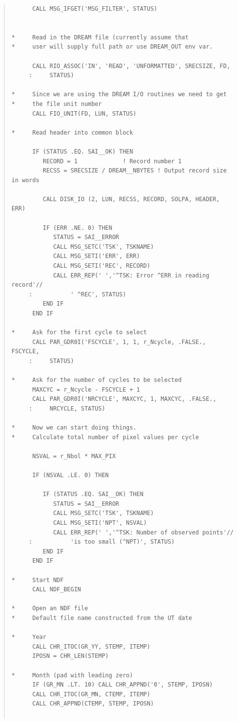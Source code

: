 \documentclass[twoside,11pt]{article}
\newenvironment{myquote}{\begin{quote}\begin{small}}{\end{small}\end{quote}}
\renewcommand{\_}{\texttt{\symbol{95}}}
\begin{document}
\begin{myquote}
\begin{verbatim}
      CALL MSG_IFGET('MSG_FILTER', STATUS)


*     Read in the DREAM file (currently assume that
*     user will supply full path or use DREAM_OUT env var.

      CALL RIO_ASSOC('IN', 'READ', 'UNFORMATTED', SRECSIZE, FD,
     :     STATUS)

*     Since we are using the DREAM I/O routines we need to get
*     the file unit number
      CALL FIO_UNIT(FD, LUN, STATUS)

*     Read header into common block

      IF (STATUS .EQ. SAI__OK) THEN
         RECORD = 1             ! Record number 1
         RECSS = SRECSIZE / DREAM__NBYTES ! Output record size in words

         CALL DISK_IO (2, LUN, RECSS, RECORD, SOLPA, HEADER, ERR)

         IF (ERR .NE. 0) THEN
            STATUS = SAI__ERROR
            CALL MSG_SETC('TSK', TSKNAME)
            CALL MSG_SETI('ERR', ERR)
            CALL MSG_SETI('REC', RECORD)
            CALL ERR_REP(' ','^TSK: Error ^ERR in reading record'//
     :           ' ^REC', STATUS)
         END IF
      END IF

*     Ask for the first cycle to select
      CALL PAR_GDR0I('FSCYCLE', 1, 1, r_Ncycle, .FALSE., FSCYCLE,
     :     STATUS)

*     Ask for the number of cycles to be selected
      MAXCYC = r_Ncycle - FSCYCLE + 1
      CALL PAR_GDR0I('NRCYCLE', MAXCYC, 1, MAXCYC, .FALSE.,
     :     NRCYCLE, STATUS)

*     Now we can start doing things.
*     Calculate total number of pixel values per cycle

      NSVAL = r_Nbol * MAX_PIX

      IF (NSVAL .LE. 0) THEN

         IF (STATUS .EQ. SAI__OK) THEN
            STATUS = SAI__ERROR
            CALL MSG_SETC('TSK', TSKNAME)
            CALL MSG_SETI('NPT', NSVAL)
            CALL ERR_REP(' ','^TSK: Number of observed points'//
     :           'is too small (^NPT)', STATUS)
         END IF
      END IF

*     Start NDF
      CALL NDF_BEGIN

*     Open an NDF file
*     Default file name constructed from the UT date

*     Year
      CALL CHR_ITOC(GR_YY, STEMP, ITEMP)
      IPOSN = CHR_LEN(STEMP)

*     Month (pad with leading zero)
      IF (GR_MN .LT. 10) CALL CHR_APPND('0', STEMP, IPOSN)
      CALL CHR_ITOC(GR_MN, CTEMP, ITEMP)
      CALL CHR_APPND(CTEMP, STEMP, IPOSN)


\end{verbatim}
\end{myquote}
\end{document}
